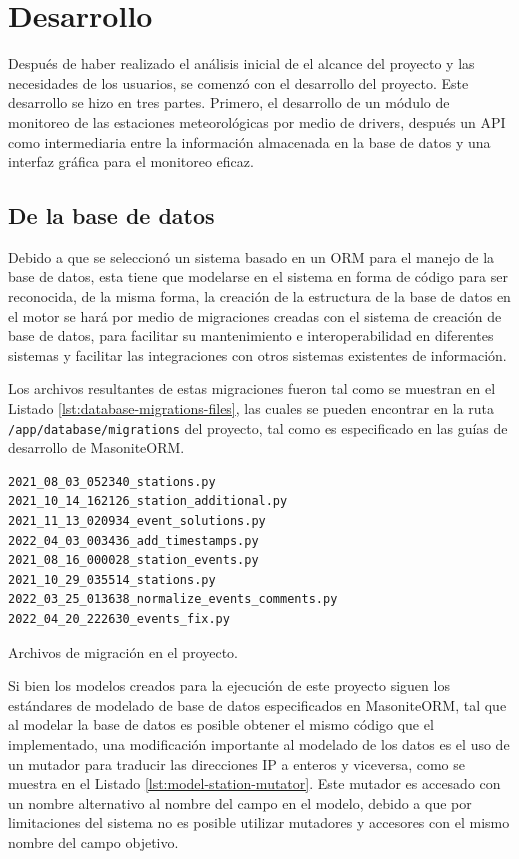 
\section{Desarrollo}

Después de haber realizado el análisis inicial de el alcance del proyecto y las necesidades de los usuarios, se comenzó con el desarrollo del proyecto. Este desarrollo se hizo en tres partes. Primero, el desarrollo de un módulo de monitoreo de las estaciones meteorológicas por medio de drivers,  después un API como intermediaria entre la información almacenada en la base de datos y una interfaz gráfica para el monitoreo eficaz.

\subsection{De la base de datos}

Debido a que se seleccionó un sistema basado en un ORM para el manejo de la base de datos, esta tiene que modelarse en el sistema en forma de código para ser reconocida, de la misma forma, la creación de la estructura de la base de datos en el motor se hará por medio de migraciones creadas con el sistema de creación de base de datos, para facilitar su mantenimiento e interoperabilidad en diferentes sistemas y facilitar las integraciones con otros sistemas existentes de información.

Los archivos resultantes de estas migraciones fueron tal como se muestran en el Listado \ref{lst:database-migrations-files}, las cuales se pueden encontrar en la ruta \texttt{/app/database/migrations} del proyecto, tal como es especificado en las guías de desarrollo de MasoniteORM.

\begin{listing}
\begin{verbatim}
2021_08_03_052340_stations.py
2021_10_14_162126_station_additional.py
2021_11_13_020934_event_solutions.py            2022_04_03_003436_add_timestamps.py
2021_08_16_000028_station_events.py
2021_10_29_035514_stations.py
2022_03_25_013638_normalize_events_comments.py
2022_04_20_222630_events_fix.py
\end{verbatim}
\caption{Archivos de migración en el proyecto.}
\label{lst:database-migrations-files}
\end{listing}

Si bien los modelos creados para la ejecución de este proyecto siguen los estándares de modelado de base de datos especificados en MasoniteORM, tal que al modelar la base de datos es posible obtener el mismo código que el implementado, una modificación importante al modelado de los datos es el uso de un mutador para traducir las direcciones IP a enteros y viceversa, como se muestra en el Listado \ref{lst:model-station-mutator}. Este mutador es accesado con un nombre alternativo al nombre del campo en el modelo, debido a que por limitaciones del sistema no es posible utilizar mutadores y accesores con el mismo nombre del campo objetivo.

